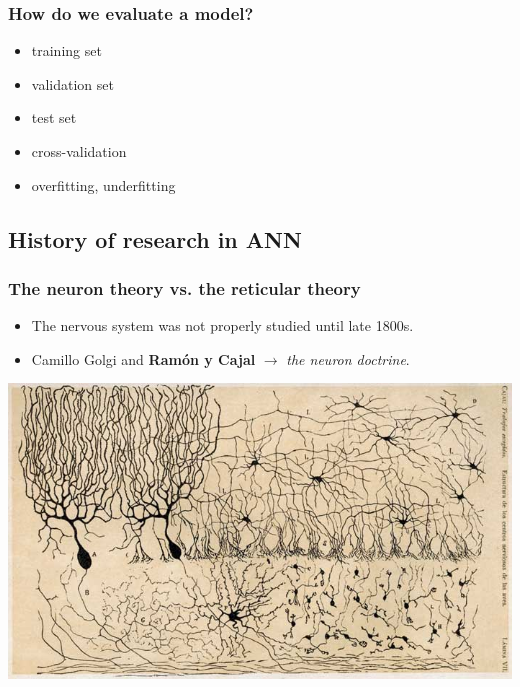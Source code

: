 \begin{frame}
  \frametitle{How do we evaluate a model?}
  \begin{itemize}
  \item training set
  \item validation set
  \item test set
  \item cross-validation
  \item overfitting, underfitting
  \end{itemize}
\end{frame}


\subsection{History of research in ANN}
\label{sec:history}

\begin{frame}
  \frametitle{The neuron theory vs. the reticular theory}
  \begin{itemize}
  \item The nervous system was not properly studied until late 1800s.
  \item Camillo Golgi and \textbf{Ram\'{o}n y Cajal} $\longrightarrow$
    \emph{the neuron doctrine}.
  \end{itemize}
  \begin{center}
    \includegraphics[height=.6\textheight]{graphics/cajal.jpg}
  \end{center}
\end{frame}

